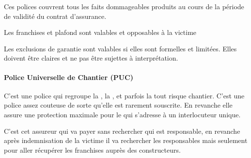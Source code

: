 		Ces polices couvrent tous les faits dommageables produits au cours de la période de validité du contrat d’assurance.

		\medbreak Les franchises et plafond sont valables et opposables à la victime

		\medbreak Les exclusions de garantie sont valables si elles sont formelles et limitées. Elles doivent être claires et ne pas être sujettes à interprétation.


	\paragraph{Police Universelle de Chantier (PUC)}

		C'est une police qui regroupe la \do, la \rcd, et \cnr parfois la tout risque chantier. C'est une police assez couteuse de sorte qu'elle est rarement souscrite. En revanche elle assure une protection maximale pour le \Mo qui s'adresse à un interlocuteur unique.

		C’est cet assureur qui va payer sans rechercher qui est responsable, en revanche après indemnisation de la victime il va rechercher les responsables mais seulement pour aller récupérer les franchises auprès des constructeurs.
